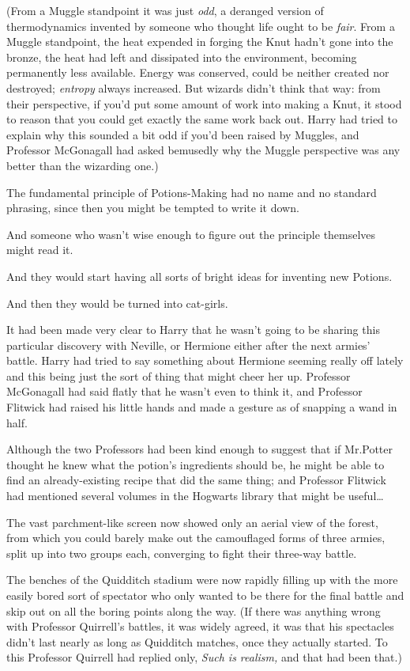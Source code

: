(From a Muggle standpoint it was just \emph{odd}, a deranged version of thermodynamics invented by someone who thought life ought to be \emph{fair}. From a Muggle standpoint, the heat expended in forging the Knut hadn't gone into the bronze, the heat had left and dissipated into the environment, becoming permanently less available. Energy was conserved, could be neither created nor destroyed; \emph{entropy} always increased. But wizards didn't think that way: from their perspective, if you'd put some amount of work into making a Knut, it stood to reason that you could get exactly the same work back out. Harry had tried to explain why this sounded a bit odd if you'd been raised by Muggles, and Professor McGonagall had asked bemusedly why the Muggle perspective was any better than the wizarding one.)

The fundamental principle of Potions-Making had no name and no standard phrasing, since then you might be tempted to write it down.

And someone who wasn't wise enough to figure out the principle themselves might read it.

And they would start having all sorts of bright ideas for inventing new Potions.

And then they would be turned into cat-girls.

It had been made very clear to Harry that he wasn't going to be sharing this particular discovery with Neville, or Hermione either after the next armies' battle. Harry had tried to say something about Hermione seeming really off lately and this being just the sort of thing that might cheer her up. Professor McGonagall had said flatly that he wasn't even to think it, and Professor Flitwick had raised his little hands and made a gesture as of snapping a wand in half.

Although the two Professors had been kind enough to suggest that if Mr.\?Potter thought he knew what the potion's ingredients should be, he might be able to find an already-existing recipe that did the same thing; and Professor Flitwick had mentioned several volumes in the Hogwarts library that might be useful{\ldots}

\later

The vast parchment-like screen now showed only an aerial view of the forest, from which you could barely make out the camouflaged forms of three armies, split up into two groups each, converging to fight their three-way battle.

The benches of the Quidditch stadium were now rapidly filling up with the more easily bored sort of spectator who only wanted to be there for the final battle and skip out on all the boring points along the way. (If there was anything wrong with Professor Quirrell's battles, it was widely agreed, it was that his spectacles didn't last nearly as long as Quidditch matches, once they actually started. To this Professor Quirrell had replied only, \emph{Such is realism,} and that had been that.)

